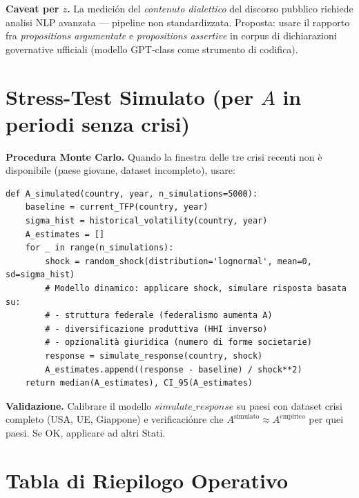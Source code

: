 \Conj{} \textbf{Caveat per \(z\).} La medición del \emph{contenuto
dialettico} del discorso pubblico richiede analisi NLP avanzata ---
pipeline non standardizzata. Proposta: usare il rapporto fra
\emph{propositions argumentate} e \emph{propositions assertive} in
corpus di dichiarazioni governative ufficiali (modello GPT-class come
strumento di codifica).



\section{\texorpdfstring{Stress-Test Simulato (per \(A\) in periodi
senza
crisi)}{Stress-Test Simulato (per A in periodi senza crisi)}}\label{stress-test-simulato-per-a-in-periodi-senza-crisi}

\Hypoth{} \textbf{Procedura Monte Carlo.} Quando la finestra delle tre
crisi recenti non è disponibile (paese giovane, dataset incompleto),
usare:

\begin{verbatim}
def A_simulated(country, year, n_simulations=5000):
    baseline = current_TFP(country, year)
    sigma_hist = historical_volatility(country, year)
    A_estimates = []
    for _ in range(n_simulations):
        shock = random_shock(distribution='lognormal', mean=0, sd=sigma_hist)
        # Modello dinamico: applicare shock, simulare risposta basata su:
        # - struttura federale (federalismo aumenta A)
        # - diversificazione produttiva (HHI inverso)
        # - opzionalità giuridica (numero di forme societarie)
        response = simulate_response(country, shock)
        A_estimates.append((response - baseline) / shock**2)
    return median(A_estimates), CI_95(A_estimates)
\end{verbatim}

\Proved{} \textbf{Validazione.} Calibrare il modello
\(simulate\_response\) su paesi con dataset crisi completo (USA, UE,
Giappone) e verificaciónre che
\(A^{\text{simulato}} \approx A^{\text{empirico}}\) per quei paesi. Se
OK, applicare ad altri Stati.



\section{Tabla di Riepilogo
Operativo}\label{tabla-di-riepilogo-operativo}


